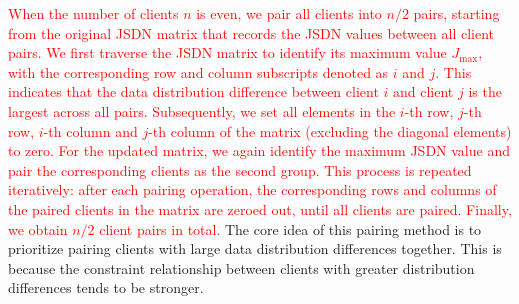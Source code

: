 \documentclass[journal,twoside,web]{ieeecolor}
\newcommand{\rev}[1]{\textcolor{red}{#1}}
\begin{document}
\rev{When the number of clients $n$ is even, we pair all clients into $n/2$ pairs, starting from the original JSDN matrix that records the JSDN values between all client pairs. We first traverse the JSDN matrix to identify its maximum value $J_{\text{max}}$, with the corresponding row and column subscripts denoted as $i$ and $j$. This indicates that the data distribution difference between client $i$ and client $j$ is the largest across all pairs.
Subsequently, we set all elements in the $i$-th row, $j$-th row, $i$-th column and $j$-th column of the matrix (excluding the diagonal elements) to zero. For the updated matrix, we again identify the maximum JSDN value and pair the corresponding clients as the second group. This process is repeated iteratively: after each pairing operation, the corresponding rows and columns of the paired clients in the matrix are zeroed out, until all clients are paired. Finally, we obtain $n/2$ client pairs in total.}
The core idea of this pairing method is to prioritize pairing clients with large data distribution differences together. This is because the constraint relationship between clients with greater distribution differences tends to be stronger.




\end{document}
